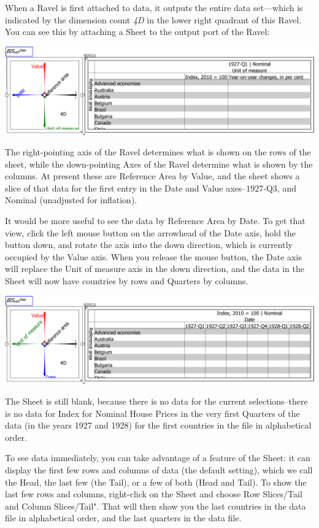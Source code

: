 When a Ravel is first attached to data, it outputs the entire data
set---which is indicated by the dimension count \emph{4D} in the
lower right quadrant of this Ravel. You can see this by attaching
a Sheet to the output port of the Ravel:

\includegraphics[width=15cm]{images/tut01Ravel4DwithSheet}

The right-pointing axis of the Ravel determines what is shown on the
rows of the sheet, while the down-pointing Axes of the Ravel determine
what is shown by the columns. At present these are Reference Area
by Value, and the sheet shows a slice of that data for the first entry
in the Date and Value axes--1927-Q3, and Nominal (unadjusted for
inflation).

It would be more useful to see the data by Reference Area by Date.
To get that view, click the left mouse button on the arrowhead of
the Date axis, hold the button down, and rotate the axis into the
down direction, which is currently occupied by the Value axis. When
you release the mouse button, the Date axis will replace the Unit
of measure axis in the down direction, and the data in the Sheet will
now have countries by rows and Quarters by columns.

\includegraphics[width=15cm]{images/tut02HPI4DwithSheetRotatedCountryDate}

The Sheet is still blank, because there is no data for the current
selections--there is no data for Index for Nominal House Prices in
the very first Quarters of the data (in the years 1927 and 1928) for
the first countries in the file in alphabetical order.

To see data immediately, you can take advantage of a feature of the
Sheet: it can display the first few rows and columns of data (the
default setting), which we call the Head, the last few (the Tail),
or a few of both (Head and Tail). To show the last few rows and columns,
right-click on the Sheet and choose Row Slices/Tail and Column Slices/Tail".
That will then show you the last countries in the data file in alphabetical
order, and the last quarters in the data file.

